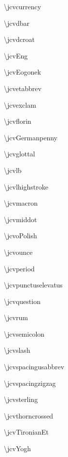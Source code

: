 \documentclass[12pt]{article}
\begin{document}
\begin{multicols}{3}
\textbackslash jcvcurrency

\textbackslash jcvdbar

\textbackslash jcvdcroat

\textbackslash jcvEng

\textbackslash jcvEogonek

\textbackslash jcvetabbrev

\textbackslash jcvexclam

\textbackslash jcvflorin

\textbackslash jcvGermanpenny

\textbackslash jcvglottal

\textbackslash jcvlb

\textbackslash jcvlhighstroke %

\textbackslash jcvmacron

\textbackslash jcvmiddot

\textbackslash jcvoPolish

\textbackslash jcvounce

\textbackslash jcvperiod

\textbackslash jcvpunctuselevatus

\textbackslash jcvquestion

\textbackslash jcvrum

\textbackslash jcvsemicolon

\textbackslash jcvslash

\textbackslash jcvspacingusabbrev

\textbackslash jcvspacingzigzag

\textbackslash jcvsterling

\textbackslash jcvthorncrossed

\textbackslash jcvTironianEt

\textbackslash jcvYogh
\end{multicols}
\end{document}
